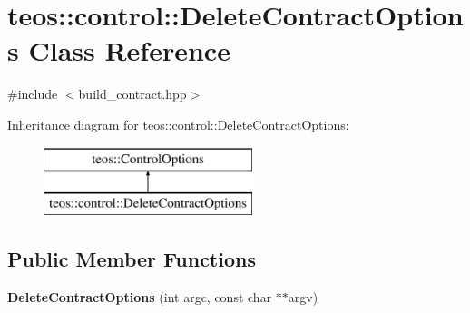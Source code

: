 \hypertarget{classteos_1_1control_1_1_delete_contract_options}{}\section{teos\+:\+:control\+:\+:Delete\+Contract\+Options Class Reference}
\label{classteos_1_1control_1_1_delete_contract_options}


{\ttfamily \#include $<$build\+\_\+contract.\+hpp$>$}

Inheritance diagram for teos\+:\+:control\+:\+:Delete\+Contract\+Options\+:\begin{figure}[H]
\begin{center}
\leavevmode
\includegraphics[height=2.000000cm]{classteos_1_1control_1_1_delete_contract_options}
\end{center}
\end{figure}
\subsection*{Public Member Functions}
\begin{DoxyCompactItemize}
\item 
\mbox{\label{classteos_1_1control_1_1_delete_contract_options_afc38af8415d9ab6117a00fb21437f903}} 
{\bfseries Delete\+Contract\+Options} (int argc, const char $\ast$$\ast$argv)
\end{DoxyCompactItemize}
